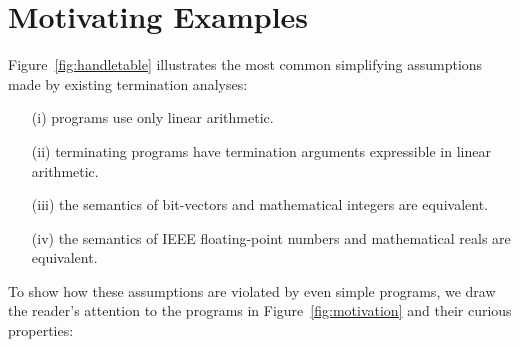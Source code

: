 \documentclass[preprint]{sigplanconf}
\theoremstyle{definition}
\begin{document}
\section{Motivating Examples} \label{sec:motivation}

Figure~\ref{fig:handletable} illustrates the most common simplifying
assumptions made by existing termination analyses:
%
\begin{itemize}
\item[(i)] programs use only linear arithmetic.
\item[(ii)] terminating programs have termination arguments expressible in linear arithmetic.
\item[(iii)] the semantics of bit-vectors and mathematical integers are equivalent.
\item[(iv)] the semantics of IEEE floating-point numbers and mathematical reals are equivalent.
\end{itemize}  

To show how these assumptions are violated by even simple programs, we draw
the reader's attention to the programs in Figure~\ref{fig:motivation} and
their curious properties:
\end{document}
